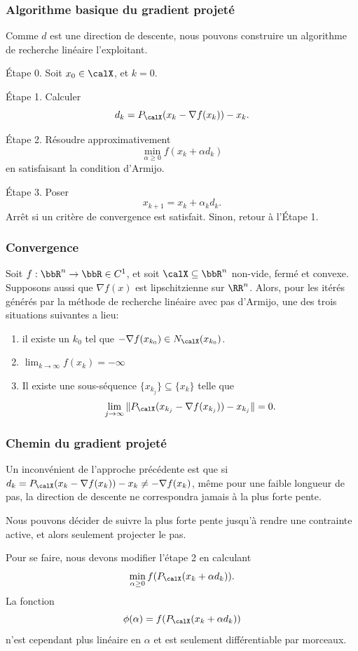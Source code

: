 \documentclass[t,aspectratio=169,usepdftitle=false]{beamer}
\def\blue{\color{blue}}
\def\cX{\calX}
\begin{document}
\begin{frame}
\frametitle{Algorithme basique du gradient projeté}

Comme $d$ est une direction de descente, nous pouvons construire un algorithme de recherche linéaire l'exploitant.

{\blue Étape 0.}
Soit $x_0 \in \cX$, et $k = 0$.

{\blue Étape 1.}
Calculer
$$
d_k = P_{\cX} (x_k - \nabla f(x_k)) - x_k.
$$

{\blue Étape 2.}
Résoudre approximativement
$$
\min_{\alpha \geq 0} f(x_k + \alpha d_k)
$$
en satisfaisant la condition d'Armijo.

{\blue Étape 3.}
Poser
$$
x_{k+1} = x_k + \alpha_k d_k.
$$
Arrêt si un critère de convergence est satisfait.
Sinon, retour à l'Étape 1.

\end{frame}

\begin{frame}
\frametitle{Convergence}

Soit $f: \bbR^n \rightarrow \bbR \in C^1$, et soit $\cX \subseteq \bbR^n$ non-vide, fermé et convexe.
Supposons aussi que $\nabla f(x)$ est lipschitzienne sur $\RR^n$.
Alors, pour les itérés générés par la méthode de recherche linéaire avec pas d'Armijo, une des trois situations suivantes a lieu:
\begin{enumerate}
\item
il existe un $k_0$ tel que $-\nabla f(x_{k_0}) \in N_{\cX}(x_{k_0})$.
\item
$\lim_{k \rightarrow \infty} f(x_k) = -\infty$
\item
Il existe une sous-séquence $\{ x_{k_j} \} \subseteq \{ x_{k} \}$
telle que
$$
\lim_{j \rightarrow \infty} \| P_{\cX}(x_{k_j} - \nabla f(x_{k_j})) - x_{k_j} \| = 0.
$$
\end{enumerate}

\end{frame}

%	

\begin{frame}
\frametitle{Chemin du gradient projeté}

Un inconvénient de l'approche précédente est que si
$d_k = P_{\cX} (x_k - \nabla f(x_k)) - x_k \ne -\nabla f(x_k)$,
même pour une faible longueur de pas, la direction de descente ne correspondra jamais à la plus forte pente.

\mbox{}

Nous pouvons décider de suivre la plus forte pente jusqu'à rendre une contrainte active, et alors seulement projecter le pas.

\mbox{}

Pour se faire, nous devons modifier l'étape 2 en calculant
$$
\min_{\alpha \geq 0} f(P_{\cX}(x_k + \alpha d_k)).
$$
La fonction
$$
\phi(\alpha) = f(P_{\cX}(x_k + \alpha d_k))
$$
n'est cependant plus linéaire en $\alpha$ et est seulement différentiable par morceaux.

\end{frame}
\end{document}
